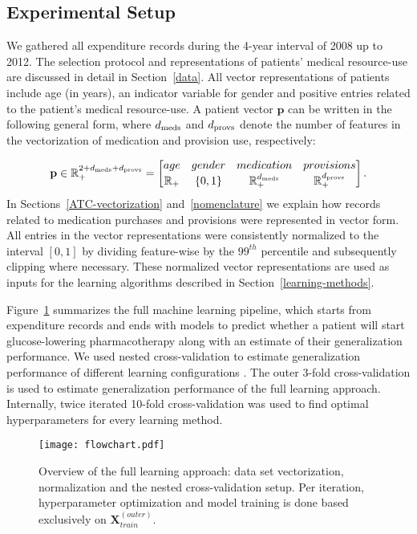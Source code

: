 \subsection{Experimental Setup} \label{setup}
We gathered all expenditure records during the 4-year interval of 2008 up to 2012. The selection protocol and representations of patients' medical resource-use are discussed in detail in Section~\ref{data}. All vector representations of patients include age (in years), an indicator variable for gender and positive entries related to the patient's medical resource-use. A patient vector $\mathbf{p}$ can be written in the following general form, where $d_{\rm meds}$ and $d_{\rm provs}$ denote the number of features in the vectorization of medication and provision use, respectively:

\begin{equation}
\mathbf{p} \in \mathbb{R}^{2 + d_{\rm meds} + d_{\rm provs}}_+ = 
\begin{bmatrix} 
age 		& gender 	& medication		& provisions  \\
\mathbb{R}_+	& \{0, 1\}	& \mathbb{R}^{d_{\rm meds}}_+	& \mathbb{R}^{d_{\rm provs}}_+ 
\end{bmatrix}.
\end{equation}
In Sections~\ref{ATC-vectorization} and~\ref{nomenclature} we explain how records related to medication purchases and provisions were represented in vector form. All entries in the vector representations were consistently normalized to the interval $[0, 1]$ by dividing feature-wise by the $99^{th}$ percentile and subsequently clipping where necessary. These normalized vector representations are used as inputs for the learning algorithms described in Section~\ref{learning-methods}.

Figure~\ref{fig:flowchart} summarizes the full machine learning pipeline, which starts from expenditure records and ends with models to predict whether a patient will start glucose-lowering pharmacotherapy along with an estimate of their generalization performance. We used nested cross-validation to estimate generalization performance of different learning configurations \citep{varma2006bias}. The outer 3-fold cross-validation is used to estimate generalization performance of the full learning approach. Internally, twice iterated 10-fold cross-validation was used to find optimal hyperparameters for every learning method.

\begin{figure}[!h]
  \centering
  \texttt{[image: flowchart.pdf]}
  \caption{Overview of the full learning approach: data set vectorization, normalization and the nested cross-validation setup. Per iteration, hyperparameter optimization and model training is done based exclusively on $\mathbf{X}_{train}^{(outer)}$.} 
  \label{fig:flowchart}
\end{figure}

